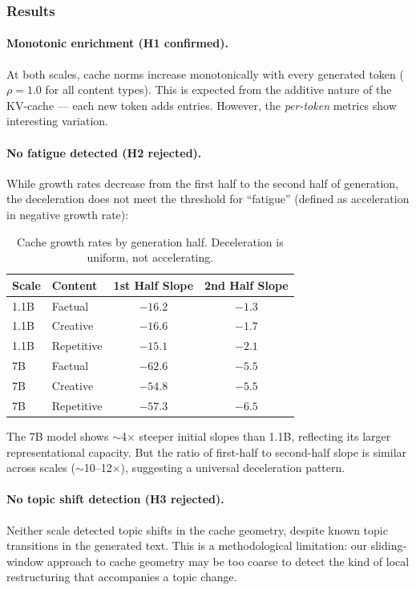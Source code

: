 \documentclass[11pt,a4paper]{article}
\begin{document}
\subsubsection{Results}

\paragraph{Monotonic enrichment (H1 confirmed).} At both scales, cache norms increase monotonically with every generated token ($\rho = 1.0$ for all content types). This is expected from the additive nature of the KV-cache --- each new token adds entries. However, the \emph{per-token} metrics show interesting variation.

\paragraph{No fatigue detected (H2 rejected).} While growth rates decrease from the first half to the second half of generation, the deceleration does not meet the threshold for ``fatigue'' (defined as acceleration in negative growth rate):

\begin{table}[H]
\centering
\caption{Cache growth rates by generation half. Deceleration is uniform, not accelerating.}
\label{tab:temporal_fatigue}
\begin{tabular}{llcc}
\toprule
\textbf{Scale} & \textbf{Content} & \textbf{1st Half Slope} & \textbf{2nd Half Slope} \\
\midrule
1.1B & Factual & $-16.2$ & $-1.3$ \\
1.1B & Creative & $-16.6$ & $-1.7$ \\
1.1B & Repetitive & $-15.1$ & $-2.1$ \\
\midrule
7B & Factual & $-62.6$ & $-5.5$ \\
7B & Creative & $-54.8$ & $-5.5$ \\
7B & Repetitive & $-57.3$ & $-6.5$ \\
\bottomrule
\end{tabular}
\end{table}

The 7B model shows $\sim$4$\times$ steeper initial slopes than 1.1B, reflecting its larger representational capacity. But the ratio of first-half to second-half slope is similar across scales ($\sim$10--12$\times$), suggesting a universal deceleration pattern.

\paragraph{No topic shift detection (H3 rejected).} Neither scale detected topic shifts in the cache geometry, despite known topic transitions in the generated text. This is a methodological limitation: our sliding-window approach to cache geometry may be too coarse to detect the kind of local restructuring that accompanies a topic change.
\end{document}
